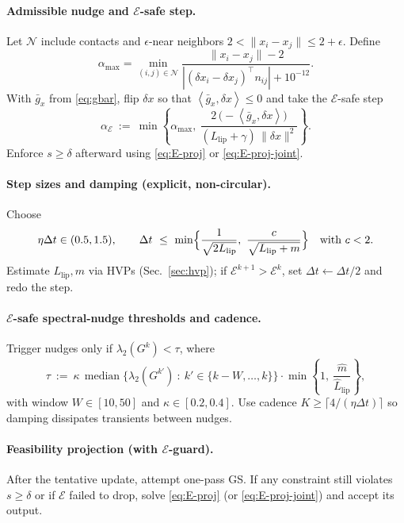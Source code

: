 \documentclass[11pt]{article}
\theoremstyle{remark}
\theoremstyle{definition}
\newcommand{\inner}[2]{\left\langle #1, #2 \right\rangle}
\newcommand{\Llip}{L_{\text{lip}}}
\begin{document}
\paragraph{Admissible nudge and \(\mathcal{E}\)-safe step.}
Let $\mathcal{N}$ include contacts and $\epsilon$-near neighbors $2<\|x_i-x_j\|\le 2+\epsilon$. Define
\begin{equation}\label{eq:alpha}
\alpha_{\max} = \min_{(i,j)\in \mathcal{N}} \frac{\|x_i-x_j\|-2}{|( \delta x_i - \delta x_j )^\top n_{ij}| + 10^{-12}}.
\end{equation}
With $\bar g_x$ from \eqref{eq:gbar}, flip $\delta x$ so that $\inner{\bar g_x}{\delta x}\le 0$ and take the \(\mathcal{E}\)-safe step
\begin{equation}\label{eq:alphaEsafe}
\alpha_{\mathcal{E}}\ :=\ \min\!\left\{\alpha_{\max},\ \frac{2\,\bigl(-\inner{\bar g_x}{\delta x}\bigr)}{(\Llip+\gamma)\,\|\delta x\|^2}\right\}.
\end{equation}
Enforce $s\ge \delta$ afterward using \eqref{eq:E-proj} or \eqref{eq:E-proj-joint}.

\paragraph{Step sizes and damping (explicit, non-circular).}
Choose
\[
\eta\Delta t\in(0.5,1.5),\qquad
\Delta t\ \le\ \min\Bigl\{ \frac{1}{\sqrt{2\Llip}},\ \frac{c}{\sqrt{\Llip+m}} \Bigr\}\quad\text{with }c<2.
\]
Estimate $\Llip,m$ via HVPs (Sec.~\ref{sec:hvp}); if $\mathcal{E}^{k+1}>\mathcal{E}^{k}$, set $\Delta t\leftarrow \Delta t/2$ and redo the step.

\paragraph{\(\mathcal{E}\)-safe spectral-nudge thresholds and cadence.}
Trigger nudges only if $\lambda_2(G^k)<\tau$, where
\[
\tau\ :=\ \kappa\,\operatorname{median}\bigl\{\lambda_2(G^{k'})\ :\ k'\in\{k-W,\dots,k\}\bigr\}\cdot \min\!\left\{1,\ \frac{\hat m}{\hat \Llip}\right\},
\]
with window $W\in[10,50]$ and $\kappa\in[0.2,0.4]$. Use cadence $K\ge \lceil 4/(\eta\Delta t)\rceil$ so damping dissipates transients between nudges.

\paragraph{Feasibility projection (with \(\mathcal{E}\)-guard).}
After the tentative update, attempt one-pass GS. If any constraint still violates $s\ge\delta$ or if $\mathcal{E}$ failed to drop, solve \eqref{eq:E-proj} (or \eqref{eq:E-proj-joint}) and accept its output.
\end{document}
